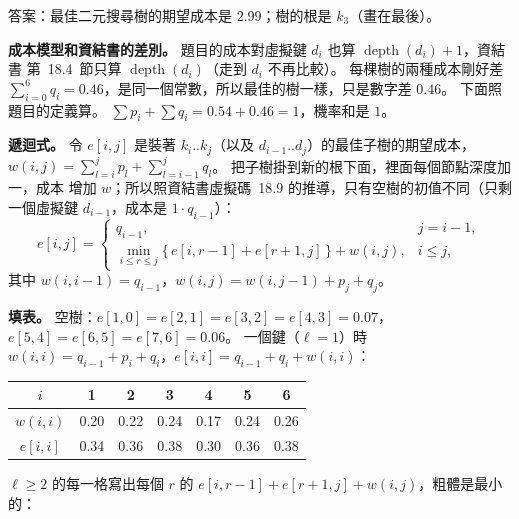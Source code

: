 \begin{pastsoln}
答案：最佳二元搜尋樹的期望成本是 $2.99$；樹的根是 $k_3$（畫在最後）。

\textbf{成本模型和資結書的差別。} 題目的成本對虛擬鍵 $d_i$ 也算 $\operatorname{depth}(d_i) + 1$，資結書
第~18.4~節只算 $\operatorname{depth}(d_i)$（走到 $d_i$ 不再比較）。 每棵樹的兩種成本剛好差
$\sum_{i=0}^{6} q_i = 0.46$，是同一個常數，所以最佳的樹一樣，只是數字差 $0.46$。 下面照題目的定義算。
$\sum p_i + \sum q_i = 0.54 + 0.46 = 1$，機率和是 $1$。

\textbf{遞迴式。} 令 $e[i, j]$ 是裝著 $k_i..k_j$（以及 $d_{i-1}..d_j$）的最佳子樹的期望成本，
$w(i, j) = \sum_{l=i}^{j} p_l + \sum_{l=i-1}^{j} q_l$。 把子樹掛到新的根下面，裡面每個節點深度加一，成本
增加 $w$；所以照資結書虛擬碼~18.9 的推導，只有空樹的初值不同（只剩一個虛擬鍵 $d_{i-1}$，成本是
$1 \cdot q_{i-1}$）：
\[
e[i, j] = \begin{cases}
q_{i-1}, & j = i - 1, \\[2pt]
\displaystyle\min_{i \le r \le j} \bigl\{\, e[i, r-1] + e[r+1, j] \,\bigr\} + w(i, j), & i \le j ,
\end{cases}
\]
其中 $w(i, i-1) = q_{i-1}$，$w(i, j) = w(i, j-1) + p_j + q_j$。

\textbf{填表。} 空樹：$e[1,0] = e[2,1] = e[3,2] = e[4,3] = 0.07$，$e[5,4] = e[6,5] = e[7,6] = 0.06$。
一個鍵（$\ell = 1$）時 $w(i, i) = q_{i-1} + p_i + q_i$，$e[i, i] = q_{i-1} + q_i + w(i, i)$：
\begin{center}
\small
\begin{tabular}{ccccccc}
\toprule
$i$ & 1 & 2 & 3 & 4 & 5 & 6 \\
\midrule
$w(i, i)$ & 0.20 & 0.22 & 0.24 & 0.17 & 0.24 & 0.26 \\
$e[i, i]$ & 0.34 & 0.36 & 0.38 & 0.30 & 0.36 & 0.38 \\
\bottomrule
\end{tabular}
\end{center}
$\ell \ge 2$ 的每一格寫出每個 $r$ 的 $e[i, r-1] + e[r+1, j] + w(i, j)$，粗體是最小的：


\end{pastsoln}
